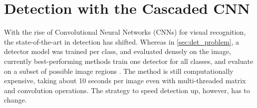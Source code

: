 \chapter{Detection with the Cascaded CNN}\label{sec:ccnn_chapter}

With the rise of Convolutional Neural Networks (CNNs) for visual recognition, the state-of-the-art in detection has shifted.
Whereas in \autoref{sec:det_problem}, a detector model was trained per class, and evaluated densely on the image, currently best-performing methods train one detector for all classes, and evaluate on a subset of possible image regions \parencite{Girshick-CVPR-2014}.
The method is still computationally expensive, taking about 10 seconds per image even with multi-threaded matrix and convolution operations.
The strategy to speed detection up, however, has to change.




